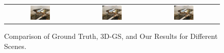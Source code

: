 \documentclass[12pt]{report}
\begin{document}
\begin{figure}[h]
\begin{tabular}{ccc}
        \includegraphics[width=0.3\textwidth]{../o-3dgs/eval/trex/test/ours_30000/gt/00000.png} & 
        \includegraphics[width=0.3\textwidth]{../o-3dgs/eval/trex/test/ours_30000/renders/00000.png} & 
        \includegraphics[width=0.3\textwidth]{../o-3dgs/eval/trex/test/ours_30000/renders/00000.png} \\
    \end{tabular}
    \caption{Comparison of Ground Truth, 3D-GS, and Our Results for Different Scenes.}
    \label{fig:comparison_tabular_loop}
\end{figure}
    
    
\end{document}
